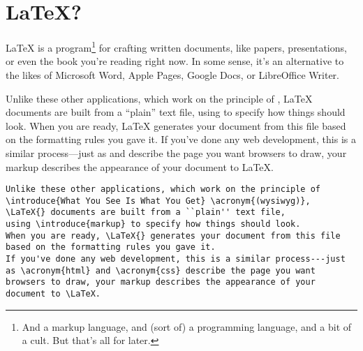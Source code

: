 \chapter{\texorpdfstring{\LaTeX}{LaTeX}?}

\LaTeX{} is a program\footnote{And a markup language,
and (sort of) a programming language, and a bit of a cult.
But that's all for later.}
for crafting written documents, like papers, presentations,
or even the book you're reading right now.
In some sense, it's an alternative to the likes of Microsoft Word,
Apple Pages, Google Docs, or LibreOffice Writer.

Unlike these other applications, which work on the principle of
 ,
\LaTeX{} documents are built from a ``plain'' text file,
using  to specify how things should look.
When you are ready, \LaTeX{} generates your document from this file
based on the formatting rules you gave it.
If you've done any web development, this is a similar process---just
as  and  describe the page you want
browsers to draw, your markup describes the appearance of your
document to \LaTeX.

\begin{leftfigure}
\begin{lstlisting}
Unlike these other applications, which work on the principle of
\introduce{What You See Is What You Get} \acronym{(wysiwyg)},
\LaTeX{} documents are built from a ``plain'' text file,
using \introduce{markup} to specify how things should look.
When you are ready, \LaTeX{} generates your document from this file
based on the formatting rules you gave it.
If you've done any web development, this is a similar process---just
as \acronym{html} and \acronym{css} describe the page you want
browsers to draw, your markup describes the appearance of your
document to \LaTeX.
\end{lstlisting}
\end{leftfigure}

